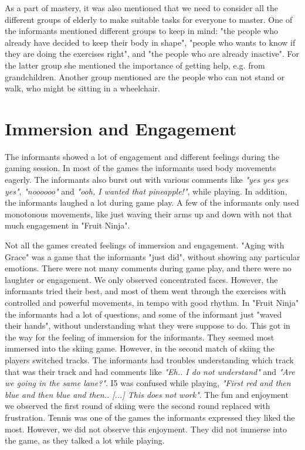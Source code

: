 As a part of mastery, it was also mentioned that we need to consider all the different groups of elderly to make suitable tasks for everyone to master. One of the informants mentioned different groups to keep in mind: "the people who already have decided to keep their body in shape", "people who wants to know if they are doing the exercises right", and "the people who are already inactive". For the latter group she mentioned the importance of getting help, e.g. from grandchildren.  Another group mentioned are the people who can not stand or walk, who might be sitting in a wheelchair.

\section{Immersion and Engagement}
The informants showed a lot of engagement and different feelings during the gaming session. In most of the games the informants used body movements eagerly. The informants also burst out with various comments like \emph{"yes yes yes yes"}, \emph{"noooooo"} and \emph{"ooh, I wanted that pineapple!"}, while playing. In addition, the informants laughed a lot during game play. A few of the informants only used monotonous movements, like just waving their arms up and down with not that much engagement in "Fruit Ninja".  

Not all the games created feelings of immersion and engagement. "Aging with Grace" was a game that the informants "just did", without showing any particular emotions. There were not many comments during game play, and there were no laughter or engagement. We only observed concentrated faces. However, the informants tried their best, and most of them went through the exercises with controlled and powerful movements, in tempo with good rhythm. In "Fruit Ninja" the informants had a lot of questions, and some of the informant just "waved their hands", without understanding what they were suppose to do. This got in the way for the feeling of immersion for the informants. They seemed most immersed into the skiing game. However, in the second match of skiing the players switched tracks. The informants had troubles understanding which track that was their track and had comments like \emph{"Eh.. I do not understand"} and \emph{"Are we going in the same lane?"}. I5 was confused while playing, \emph{"First red and then blue and then blue and then.. [...] This does not work"}. The fun and enjoyment we observed the first round of skiing were the second round replaced with frustration. Tennis was one of the games the informants expressed they liked the most. However, we did not observe this enjoyment. They did not immerse into the game, as they talked a lot while playing. 

